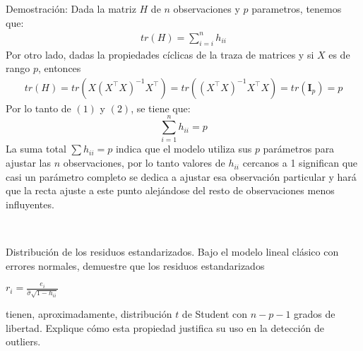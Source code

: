 \documentclass[a4paper,11pt]{article}
\begin{document}
\begin{demostracion}{Demostración:}
    Dada la matriz $H$ de $n$ observaciones y $p$ parametros, tenemos que:
    \begin{align}
        tr(H)=\sum_{i=i}^n h_{ii}
    \end{align}
    Por otro lado, dadas la propiedades cíclicas de la traza de matrices y si $X$ es de rango $p$, entonces
    \begin{align}
        tr(H)=tr(X(X^\top X)^{-1}X^\top )=tr((X^\top X)^{-1}X^\top X )=tr(\mathbf{I}_p)=p
    \end{align}
    Por lo tanto de $(1)$ y $(2)$, se tiene que:
    \[
        \sum_{i=1}^n h_{ii}=p
    \]
    La suma total $\sum h_{ii} = p$ indica que el modelo utiliza  sus $p$ parámetros para ajustar las $n$ observaciones,  por lo tanto valores de $h_{ii}$ cercanos a 1 significan que casi un parámetro completo se dedica a ajustar esa observación particular y hará que la recta ajuste a este punto alejándose del resto de observaciones menos influyentes.

    \
\end{demostracion}
\newpage
\begin{ejercicio}{3}
    Distribución de los residuos estandarizados.
    Bajo el modelo lineal clásico con errores normales, demuestre que los residuos estandarizados

    $r_i = \frac{e_i}{\hat{\sigma}\sqrt{1 - h_{ii}}}$

    tienen, aproximadamente, distribución $t$ de Student con $n - p - 1$ grados de libertad.
    Explique cómo esta propiedad justifica su uso en la detección de outliers.
\end{ejercicio}
\end{document}
